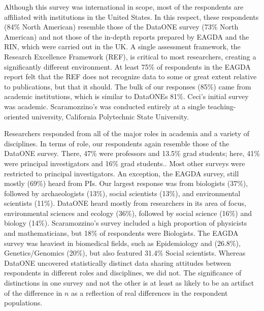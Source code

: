 \documentclass[10pt]{article}
\begin{document}
Although this survey was international in scope, most of the respondents are affiliated with institutions in the United States.
In this respect, these respondents (84\% North American) resemble those of the DataONE survey\cite{tenopir_data_2011} (73\% North American) and not those of the in-depth reports prepared by EAGDA\cite{bobrow_establishing_2014} and the RIN\cite{swan_share_2008}, which were carried out in the UK.
A single assessment framework, the Research Excellence Framework (REF), is critical to most researchers, creating a significantly different environment.
At least 75\% of respondents in the EAGDA report felt that the REF does not recognize data to some or great extent relative to publications, but that it should\cite{bobrow_establishing_2014}.
The bulk of our responses (85\%) came from academic institutions, which is similar to DataONEs 81\%\cite{tenopir_data_2011}.  
Ceci's initial survey was academic\cite{ceci_scientists_1988}.
Scaramozzino's was conducted entirely at a single teaching-oriented university, California Polytechnic State University\cite{scaramozzino_study_2012}. 

Researchers responded from all of the major roles in academia and a variety of disciplines.
In terms of role, our respondents again resemble those of the DataONE survey.
There, 47\% were professors and 13.5\% grad students; here, 41\% were principal investigators and 16\% grad students\cite{tenopir_data_2011}..
Most other surveys were restricted to principal investigators.
An exception, the EAGDA survey, still mostly (69\%) heard from PIs\cite{bobrow_establishing_2014}.
Our largest response was from biologists (37\%), followed by archaeologists (13\%), social scientists (13\%), and environmental scientists (11\%). 
DataONE heard mostly from researchers in its area of focus, environmental sciences and ecology (36\%), followed by social science (16\%) and biology (14\%)\cite{tenopir_data_2011}. 
Scaramozzino's survey included a high proportion of physicists and mathematicians, but 18\% of respondents were Biologists\cite{scaramozzino_study_2012}.
The EAGDA survey was heaviest in biomedical fields, such as Epidemiology and (26.8\%), Genetics/Genomics (20\%), but also featured 31.4\% Social scientists\cite{bobrow_establishing_2014}. 
Whereas DataONE uncovered statistically distinct data sharing attitudes between respondents in different roles and disciplines, we did not.
The significance of distinctions in one survey and not the other is at least as likely to be an artifact of the difference in $n$ as a reflection of real differences in the respondent populations.
\end{document}
